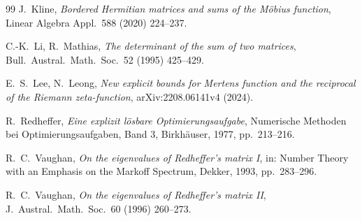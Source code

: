 \documentclass[11pt]{article}
\theoremstyle{definition}
\theoremstyle{remark}
\begin{document}
\begin{thebibliography}{99}
J.~Kline, \emph{Bordered Hermitian matrices and sums of the M\"obius function},
Linear Algebra Appl.\ 588 (2020) 224--237.

C.-K.~Li, R.~Mathias, \emph{The determinant of the sum of two matrices},
Bull.\ Austral.\ Math.\ Soc.\ 52 (1995) 425--429.

E.~S.~Lee, N.~Leong, \emph{New explicit bounds for Mertens function and the
reciprocal of the Riemann zeta-function}, arXiv:2208.06141v4 (2024).

R.~Redheffer, \emph{Eine explizit l\"osbare Optimierungsaufgabe}, Numerische
Methoden bei Optimierungsaufgaben, Band 3, Birkh\"auser, 1977, pp.\ 213--216.

R.~C.~Vaughan, \emph{On the eigenvalues of Redheffer's matrix I}, in: Number
Theory with an Emphasis on the Markoff Spectrum, Dekker, 1993, pp.\ 283--296.

R.~C.~Vaughan, \emph{On the eigenvalues of Redheffer's matrix II}, J.\ Austral.\
Math.\ Soc.\ 60 (1996) 260--273.

\end{thebibliography}
\end{document}
